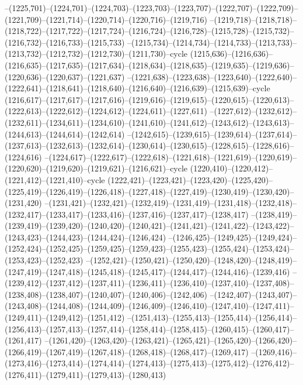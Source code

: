 --(1225,701)--(1224,701)--(1224,703)--(1223,703)--(1223,707)--(1222,707)--(1222,709)--(1221,709)--(1221,714)--(1220,714)--(1220,716)--(1219,716)
--(1219,718)--(1218,718)--(1218,722)--(1217,722)--(1217,724)--(1216,724)--(1216,728)--(1215,728)--(1215,732)--(1216,732)--(1216,733)--(1215,733)
--(1215,734)--(1214,734)--(1214,733)--(1213,733)--(1213,732)--(1212,732)--(1212,730)--(1211,730)--cycle
(1215,636)--(1216,636)--(1216,635)--(1217,635)--(1217,634)--(1218,634)--(1218,635)--(1219,635)--(1219,636)--(1220,636)--(1220,637)--(1221,637)
--(1221,638)--(1223,638)--(1223,640)--(1222,640)--(1222,641)--(1218,641)--(1218,640)--(1216,640)--(1216,639)--(1215,639)--cycle
(1216,617)--(1217,617)--(1217,616)--(1219,616)--(1219,615)--(1220,615)--(1220,613)--(1222,613)--(1222,612)--(1224,612)--(1224,611)--(1227,611)
--(1227,612)--(1232,612)--(1232,611)--(1234,611)--(1234,610)--(1241,610)--(1241,612)--(1243,612)--(1243,613)--(1244,613)--(1244,614)--(1242,614)
--(1242,615)--(1239,615)--(1239,614)--(1237,614)--(1237,613)--(1232,613)--(1232,614)--(1230,614)--(1230,615)--(1228,615)--(1228,616)--(1224,616)
--(1224,617)--(1222,617)--(1222,618)--(1221,618)--(1221,619)--(1220,619)--(1220,620)--(1219,620)--(1219,621)--(1216,621)--cycle
(1220,410)--(1220,412)--(1221,412)--(1221,410)--cycle
(1222,421)--(1223,421)--(1223,420)--(1225,420)--(1225,419)--(1226,419)--(1226,418)--(1227,418)--(1227,419)--(1230,419)--(1230,420)--(1231,420)
--(1231,421)--(1232,421)--(1232,419)--(1231,419)--(1231,418)--(1232,418)--(1232,417)--(1233,417)--(1233,416)--(1237,416)--(1237,417)--(1238,417)
--(1238,419)--(1239,419)--(1239,420)--(1240,420)--(1240,421)--(1241,421)--(1241,422)--(1243,422)--(1243,423)--(1244,423)--(1244,424)--(1246,424)
--(1246,425)--(1249,425)--(1249,424)--(1252,424)--(1252,425)--(1259,425)--(1259,423)--(1255,423)--(1255,424)--(1253,424)--(1253,423)--(1252,423)
--(1252,421)--(1250,421)--(1250,420)--(1248,420)--(1248,419)--(1247,419)--(1247,418)--(1245,418)--(1245,417)--(1244,417)--(1244,416)--(1239,416)
--(1239,412)--(1237,412)--(1237,411)--(1236,411)--(1236,410)--(1237,410)--(1237,408)--(1238,408)--(1238,407)--(1240,407)--(1240,406)--(1242,406)
--(1242,407)--(1243,407)--(1243,408)--(1244,408)--(1244,409)--(1246,409)--(1246,410)--(1247,410)--(1247,411)--(1249,411)--(1249,412)--(1251,412)
--(1251,413)--(1255,413)--(1255,414)--(1256,414)--(1256,413)--(1257,413)--(1257,414)--(1258,414)--(1258,415)--(1260,415)--(1260,417)--(1261,417)
--(1261,420)--(1263,420)--(1263,421)--(1265,421)--(1265,420)--(1266,420)--(1266,419)--(1267,419)--(1267,418)--(1268,418)--(1268,417)--(1269,417)
--(1269,416)--(1273,416)--(1273,414)--(1274,414)--(1274,413)--(1275,413)--(1275,412)--(1276,412)--(1276,411)--(1279,411)--(1279,413)--(1280,413)
